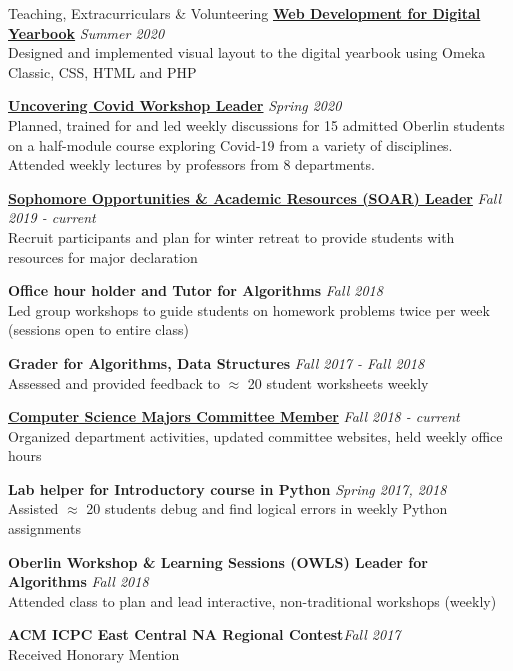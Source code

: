\documentclass{resume}
\begin{document}
\begin{rSection}{Teaching, Extracurriculars \& Volunteering}
{\bf \href{https://www.oc2020.oberlincollegelibrary.org/}{Web Development for Digital Yearbook}} \hfill{\em Summer 2020} \\
Designed and implemented visual layout to the digital yearbook using Omeka Classic, CSS, HTML and PHP

{\bf \href{https://www.oberlin.edu/admissions-and-aid/for-accepted-students/virtual-visits/covid-19-course}{Uncovering Covid Workshop Leader}} \hfill{\em Spring 2020} \\
Planned, trained for and led weekly discussions for 15 admitted Oberlin students on a half-module course exploring Covid-19 from a variety of disciplines. Attended weekly lectures by professors from 8 departments.

{\bf \href{https://www.oberlin.edu/career/set/soar/soar-leaders}{Sophomore Opportunities \& Academic Resources (SOAR) Leader}} \hfill{\em Fall 2019 - current} \\
Recruit participants and plan for winter retreat to provide students with resources for major declaration

{\bf Office hour holder and Tutor for Algorithms} \hfill {\em Fall 2018} \\
{ Led group workshops to guide students on homework problems twice per week (sessions open to entire class)} 

{\bf Grader for Algorithms, Data Structures} \hfill {\em Fall 2017 - Fall 2018} \\
{ Assessed and provided feedback to  $\approx$ 20 student worksheets weekly} 

\href{http://www.cs.oberlin.edu/~csmc/officers.php}{\textbf{Computer Science Majors Committee Member}} \hfill {\em Fall 2018 - current} \\
{ Organized department activities, updated committee websites, held weekly office hours} 

{\bf Lab helper for Introductory course in Python} \hfill {\em Spring 2017, 2018} \\
{ Assisted $\approx$ 20 students debug and find logical errors in weekly Python assignments}

{\bf Oberlin Workshop \& Learning Sessions (OWLS) Leader for Algorithms} \hfill {\em Fall 2018} \\
{ Attended class to plan and lead interactive, non-traditional workshops (weekly)} 

{\bf ACM ICPC East Central NA Regional Contest}\hfill{\em Fall 2017} \\
{Received Honorary Mention} 


\end{rSection}
\end{document}
